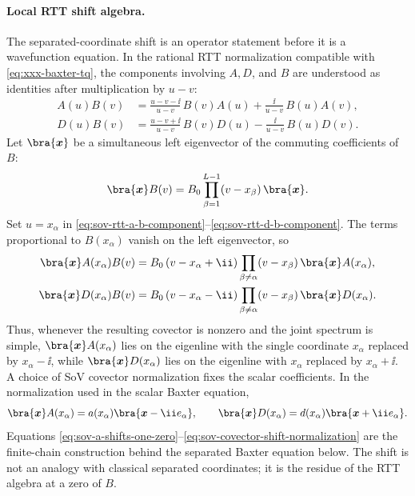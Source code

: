 \paragraph{Local RTT shift algebra.}
The separated-coordinate shift is an operator statement before it is a
wavefunction equation.  In the rational RTT normalization compatible with
\eqref{eq:xxx-baxter-tq}, the components involving \(A,D\), and \(B\) are
understood as identities after multiplication by \(u-v\):
\begin{align}
  A(u)B(v)
  &=
  \frac{u-v-\ii}{u-v}\,B(v)A(u)
  +
  \frac{\ii}{u-v}\,B(u)A(v),
  \label{eq:sov-rtt-a-b-component}\\
  D(u)B(v)
  &=
  \frac{u-v+\ii}{u-v}\,B(v)D(u)
  -
  \frac{\ii}{u-v}\,B(u)D(v).
  \label{eq:sov-rtt-d-b-component}
\end{align}
Let \(\bra{\boldsymbol x}\) be a simultaneous left eigenvector of the
commuting coefficients of \(B\):
\[
  \bra{\boldsymbol x}B(v)
  =
  B_0\prod_{\beta=1}^{L-1}(v-x_\beta)\,\bra{\boldsymbol x}.
\]
Set \(u=x_\alpha\) in
\eqref{eq:sov-rtt-a-b-component}--\eqref{eq:sov-rtt-d-b-component}.  The
terms proportional to \(B(x_\alpha)\) vanish on the left eigenvector, so
\begin{align}
  \bra{\boldsymbol x}A(x_\alpha)B(v)
  &=
  B_0\,(v-x_\alpha+\ii)
  \prod_{\beta\ne\alpha}(v-x_\beta)\,
  \bra{\boldsymbol x}A(x_\alpha),
  \label{eq:sov-a-shifts-one-zero}\\
  \bra{\boldsymbol x}D(x_\alpha)B(v)
  &=
  B_0\,(v-x_\alpha-\ii)
  \prod_{\beta\ne\alpha}(v-x_\beta)\,
  \bra{\boldsymbol x}D(x_\alpha).
  \label{eq:sov-d-shifts-one-zero}
\end{align}
Thus, whenever the resulting covector is nonzero and the joint spectrum is
simple, \(\bra{\boldsymbol x}A(x_\alpha)\) lies on the eigenline with the
single coordinate \(x_\alpha\) replaced by \(x_\alpha-\ii\), while
\(\bra{\boldsymbol x}D(x_\alpha)\) lies on the eigenline with
\(x_\alpha\) replaced by \(x_\alpha+\ii\).  A choice of SoV covector
normalization fixes the scalar coefficients.  In the normalization used in
the scalar Baxter equation,
\begin{equation}
  \bra{\boldsymbol x}A(x_\alpha)
  =
  a(x_\alpha)\bra{\boldsymbol x-\ii e_\alpha},
  \qquad
  \bra{\boldsymbol x}D(x_\alpha)
  =
  d(x_\alpha)\bra{\boldsymbol x+\ii e_\alpha}.
  \label{eq:sov-covector-shift-normalization}
\end{equation}
Equations
\eqref{eq:sov-a-shifts-one-zero}--\eqref{eq:sov-covector-shift-normalization}
are the finite-chain construction behind the separated Baxter equation
below.  The shift is not an analogy with classical separated coordinates; it
is the residue of the RTT algebra at a zero of \(B\).

